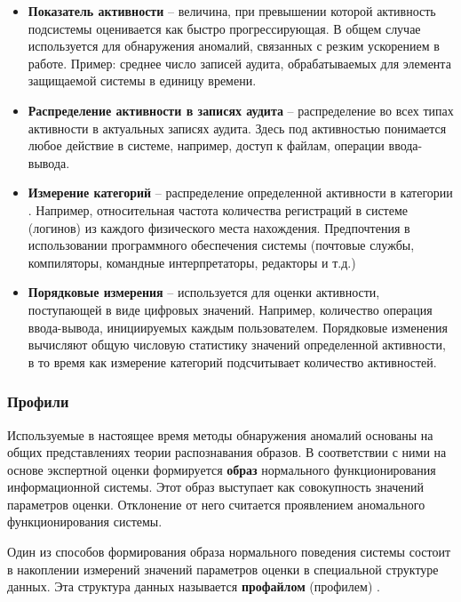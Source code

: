 \begin{itemize}
	\item \textbf{Показатель активности} -- величина, при превышении которой активность
	подсистемы оценивается как быстро прогрессирующая. В общем случае используется для
	обнаружения аномалий, связанных с резким ускорением в работе. Пример: среднее число
	записей аудита, обрабатываемых для элемента защищаемой системы в единицу времени.

	\item \textbf{Распределение активности в записях аудита} -- распределение во всех типах
	активности в актуальных записях аудита. Здесь под активностью понимается любое действие
	в системе, например, доступ к файлам, операции ввода-вывода.

	\item \textbf{Измерение категорий} -- распределение определенной активности в
	категории \footnotemark. Например, относительная частота количества регистраций в
	системе (логинов) из каждого физического места нахождения. Предпочтения в использовании
	программного обеспечения системы (почтовые службы, компиляторы, командные интерпретаторы,
	редакторы и т.д.)

	\item \textbf{Порядковые измерения} -- используется для оценки активности, поступающей
	в виде цифровых значений. Например, количество операция ввода-вывода, инициируемых каждым
	пользователем. Порядковые изменения вычисляют общую числовую статистику значений определенной
	активности, в то время как измерение категорий подсчитывает количество активностей.
\end{itemize}
\autocite{BeynonDavies}



\subsubsection{Профили}

Используемые в настоящее время методы обнаружения аномалий основаны на общих представлениях теории распознавания образов. В соответствии с ними на основе экспертной оценки формируется \textbf{образ} нормального функционирования информационной системы. Этот образ выступает как совокупность значений параметров оценки. Отклонение от него считается проявлением аномального функционирования системы.

Один из способов формирования образа нормального поведения системы состоит в накоплении измерений значений параметров оценки в специальной структуре данных. Эта структура данных называется \textbf{профайлом} (профилем) \autocite{IDSystem}.

